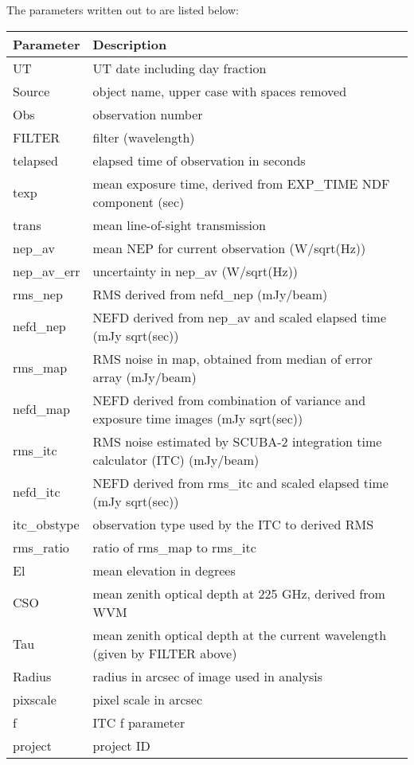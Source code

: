 The parameters written out to  are listed below:
\begin{table}[h!]
  \begin{center}
    \begin{tabular}{|p{2.5cm}|p{12cm}|}
      \hline
      \textbf{Parameter} & \textbf{Description}\\
      \hline
      UT & UT date including day fraction\\
      Source & object name, upper case with spaces removed\\
      Obs & observation number\\
      FILTER & filter (wavelength)\\
      telapsed & elapsed time of observation in seconds\\
      texp & mean exposure time, derived from EXP\_TIME NDF component (sec)\\
      trans & mean line-of-sight transmission\\
      nep\_av & mean NEP for current observation (W/sqrt(Hz))\\
      nep\_av\_err & uncertainty in nep\_av (W/sqrt(Hz))\\
      rms\_nep & RMS derived from nefd\_nep (mJy/beam)\\
      nefd\_nep & NEFD derived from nep\_av and scaled elapsed time (mJy sqrt(sec))\\
      rms\_map & RMS noise in map, obtained from median of error array (mJy/beam)\\
      nefd\_map & NEFD derived from combination of variance and exposure time images (mJy sqrt(sec))\\
      rms\_itc & RMS noise estimated by SCUBA-2 integration time calculator (ITC) (mJy/beam) \\
      nefd\_itc & NEFD derived from rms\_itc and scaled elapsed time (mJy sqrt(sec)) \\
      itc\_obstype & observation type used by the ITC to derived RMS\\
      rms\_ratio & ratio of rms\_map to rms\_itc\\
      El & mean elevation in degrees\\
      CSO & mean zenith optical depth at 225 GHz, derived from WVM\\
      Tau & mean zenith optical depth at the current wavelength (given by FILTER above)\\
      Radius & radius in arcsec of image used in analysis\\
      pixscale & pixel scale in arcsec\\
      f & ITC f parameter\\
      project & project ID\\
      \hline
    \end{tabular}
  \end{center}
\end{table}



